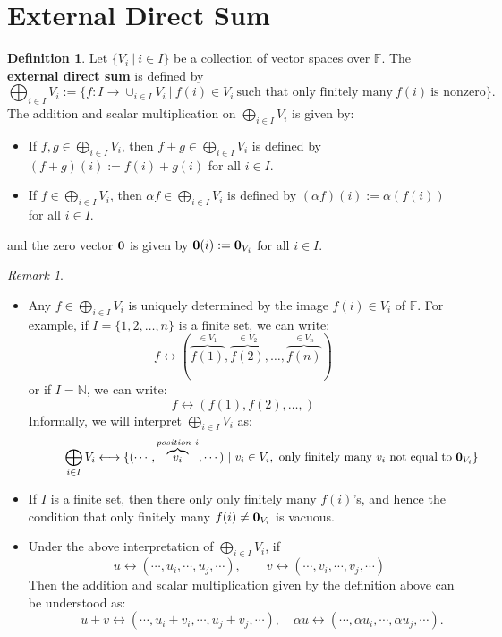 \documentclass[11pt,openany]{book}
\theoremstyle{plain}
\theoremstyle{definition}
\newtheorem{definition}[definition]{Definition}
\theoremstyle{remark}
\newtheorem{remark}[remark]{Remark}
\begin{document}
\section{External Direct Sum} \label{sec-extdirectsum}
\begin{definition}
Let $\{V_i\ |\ i \in I\}$ be a collection of vector spaces over $\mathbb{F}$. The {\bf external direct sum} is defined by
$$\bigoplus_{i \in I} V_i := \{f: I \to \cup_{i \in I} V_i \ |\ f(i) \in V_i \ \text{such that only finitely many}\ f(i)\ \text{is nonzero}\}.$$
The addition and scalar multiplication on $\bigoplus_{i \in I} V_i$ is given by:
\begin{itemize}
\item If $f, g \in \bigoplus_{i \in I} V_i$, then $f+g \in \bigoplus_{i \in I} V_i$ is defined by $(f+g)(i) := f(i)+g(i)$ for all $i \in I$.
\item If $f \in \bigoplus_{i \in I} V_i$, then $\alpha f \in \bigoplus_{i \in I} V_i$ is defined by $(\alpha f)(i) := \alpha(f(i))$ for all $i \in I$.
\end{itemize}
and the zero vector ${\bf 0}$ is given by ${\bf 0}(i) := {\bf 0}_{V_i}$ for all $i \in I$.
\end{definition}

\begin{remark}\
    \begin{itemize}
        \item Any $f \in \bigoplus_{i \in I} V_i$ is uniquely determined by the image $f(i) \in V_i$ of $\mathbb{F}$. For example, if $I = \{1,2,  \dots, n\}$ is a finite set, we can write:
        $$f \longleftrightarrow (\overbrace{f(1)}^{\in V_1}, \overbrace{f(2)}^{\in V_2}, \dots, \overbrace{f(n)}^{\in V_n})$$
        or if $I = \mathbb{N}$, we can write:
        $$f \longleftrightarrow (f(1), f(2), \dots, )$$
        Informally, we will interpret $\bigoplus_{i \in I} V_i$ as:
        $$\quad \quad \quad \bigoplus_{i \in I} V_i \longleftrightarrow \{ (\cdots, \overbrace{v_i}^{position\ i}, \cdots )\ |\ v_i \in V_i,\ \text{only finitely many}\ v_i\ \text{not equal to}\ {\bf 0}_{V_i}\}$$

        \item If $I$ is a finite set, then there only only finitely many $f(i)$'s, and hence the condition that only finitely many $f(i) \neq {\bf 0}_{V_i}$ is vacuous.

        \item Under the above interpretation of $\bigoplus_{i \in I} V_i$, if
        $$\quad u \longleftrightarrow (\cdots, u_i, \cdots, u_j, \cdots ),\quad \quad v \longleftrightarrow (\cdots, v_i, \cdots, v_j, \cdots )$$
        Then the addition and scalar multiplication given by the definition above can be understood as:
        $$\quad \quad \quad u+v \longleftrightarrow (\cdots, u_i + v_i, \cdots, u_j+v_j, \cdots ), \quad \alpha u \longleftrightarrow (\cdots, \alpha u_i, \cdots, \alpha u_j, \cdots ).$$
    \end{itemize}
\end{remark}
\end{document}
